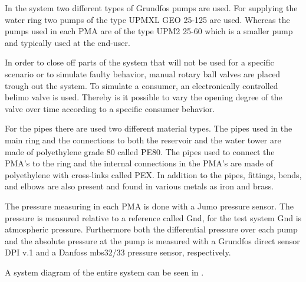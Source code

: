 In the system two different types of Grundfos pumps are used. For supplying the water ring two pumps of the type UPMXL GEO 25-125 are used. Whereas the pumps used in each PMA are of the type UPM2 25-60 which is a smaller pump and typically used at the end-user. 

In order to close off parts of the system that will not be used for a specific scenario or to simulate faulty behavior, manual rotary ball valves are placed trough out the system. 
To simulate a consumer, an electronically controlled belimo valve is used. Thereby is it possible to vary the opening degree of the valve over time according to a specific consumer behavior.   

For the pipes there are used two different material types. The pipes used in the main ring and the connections to both the reservoir and the water tower are made of polyethylene grade 80 called PE80. The pipes used to connect the PMA's to the ring and the internal connections in the PMA's are made of polyethylene with cross-links called PEX. In addition to the pipes, fittings, bends, and elbows are also present and found in various metals as iron and brass.     

The pressure measuring in each PMA is done with a Jumo pressure sensor. The pressure is measured relative to a reference called Gnd, for the test system Gnd is atmospheric pressure. Furthermore both the differential pressure over each pump and the absolute pressure at the pump is measured with a Grundfos direct sensor DPI v.1 and a Danfoss mbs32/33 pressure sensor, respectively.    

A system diagram of the entire system can be seen in .